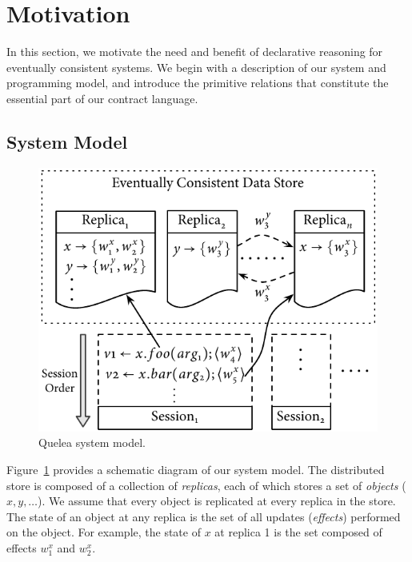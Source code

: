 \section{Motivation}
\label{sec:motivation}

In this section, we motivate the need and benefit of declarative reasoning
for eventually consistent systems.  We begin with a description of our
system and programming model, and introduce the primitive relations that
constitute the essential part of our contract language.

\subsection{System Model}
\label{sec:sysmod}

\begin{figure}
\centering
\includegraphics[width=\columnwidth]{Figures/SystemModel}
\caption{Quelea system model.}
\label{fig:sysmod}
\end{figure}

Figure~\ref{fig:sysmod} provides a schematic diagram of our system model. The
distributed store is composed of a collection of \emph{replicas}, each of which
stores a set of \emph{objects} ($x,y,\ldots$). We assume that every object is
replicated at every replica in the store. The state of an object at any replica
is the set of all updates (\emph{effects}) performed on the object. For
example, the state of $x$ at replica 1 is the set composed of effects $w^x_1$
and $w^x_2$.

